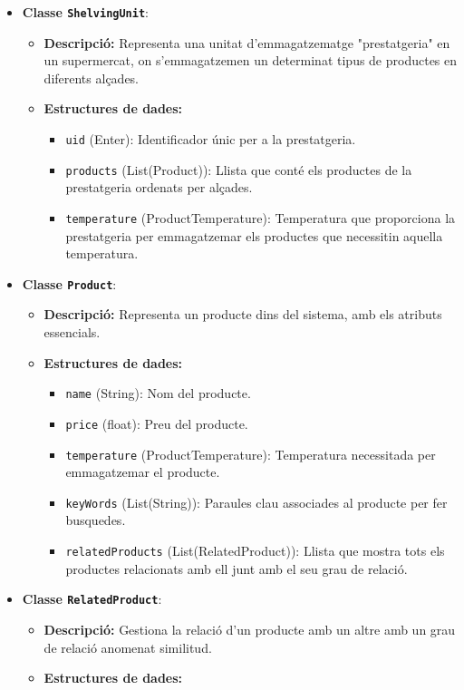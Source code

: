 \documentclass[a4paper,12pt]{report}
\begin{document}
\begin{itemize}
		\item \textbf{Classe \texttt{ShelvingUnit}}:
		\begin{itemize}
			\item \textbf{Descripció:} Representa una unitat d'emmagatzematge "prestatgeria" en un supermercat, on s'emmagatzemen un determinat tipus de productes en diferents alçades.
			\item \textbf{Estructures de dades:}
			\begin{itemize}
				\item \texttt{uid} (Enter): Identificador únic per a la prestatgeria.
				\item \texttt{products} (List(Product)): Llista que conté els productes de la prestatgeria ordenats per alçades.
				\item \texttt{temperature} (ProductTemperature): Temperatura que proporciona la prestatgeria per emmagatzemar els productes que necessitin aquella temperatura.
			\end{itemize}
		\end{itemize}
		\item \textbf{Classe \texttt{Product}}:
		\begin{itemize}
			\item \textbf{Descripció:} Representa un producte dins del sistema, amb els atributs essencials.
			\item \textbf{Estructures de dades:}
			\begin{itemize}
				\item \texttt{name} (String): Nom del producte.
				\item \texttt{price} (float): Preu del producte.
				\item \texttt{temperature} (ProductTemperature): Temperatura necessitada per emmagatzemar el producte.
				\item \texttt{keyWords} (List(String)): Paraules clau associades al producte per fer busquedes.
				\item \texttt{relatedProducts} (List(RelatedProduct)): Llista que mostra tots els productes relacionats amb ell junt amb el seu grau de relació.
			\end{itemize}
		\end{itemize}
		\item \textbf{Classe \texttt{RelatedProduct}}:
		\begin{itemize}
			\item \textbf{Descripció:} Gestiona la relació d'un producte amb un altre amb un grau de relació anomenat similitud.
			\item \textbf{Estructures de dades:}

\end{itemize}
\end{itemize}
\end{document}
